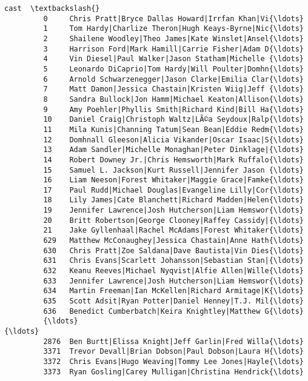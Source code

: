\documentclass[11pt]{article}
\begin{document}
\begin{Verbatim}[commandchars=\\\{\}]
                                                            cast  \textbackslash{}
         0     Chris Pratt|Bryce Dallas Howard|Irrfan Khan|Vi{\ldots}   
         1     Tom Hardy|Charlize Theron|Hugh Keays-Byrne|Nic{\ldots}   
         2     Shailene Woodley|Theo James|Kate Winslet|Ansel{\ldots}   
         3     Harrison Ford|Mark Hamill|Carrie Fisher|Adam D{\ldots}   
         4     Vin Diesel|Paul Walker|Jason Statham|Michelle {\ldots}   
         5     Leonardo DiCaprio|Tom Hardy|Will Poulter|Domhn{\ldots}   
         6     Arnold Schwarzenegger|Jason Clarke|Emilia Clar{\ldots}   
         7     Matt Damon|Jessica Chastain|Kristen Wiig|Jeff {\ldots}   
         8     Sandra Bullock|Jon Hamm|Michael Keaton|Allison{\ldots}   
         9     Amy Poehler|Phyllis Smith|Richard Kind|Bill Ha{\ldots}   
         10    Daniel Craig|Christoph Waltz|LÃ©a Seydoux|Ralp{\ldots}   
         11    Mila Kunis|Channing Tatum|Sean Bean|Eddie Redm{\ldots}   
         12    Domhnall Gleeson|Alicia Vikander|Oscar Isaac|S{\ldots}   
         13    Adam Sandler|Michelle Monaghan|Peter Dinklage|{\ldots}   
         14    Robert Downey Jr.|Chris Hemsworth|Mark Ruffalo{\ldots}   
         15    Samuel L. Jackson|Kurt Russell|Jennifer Jason {\ldots}   
         16    Liam Neeson|Forest Whitaker|Maggie Grace|Famke{\ldots}   
         17    Paul Rudd|Michael Douglas|Evangeline Lilly|Cor{\ldots}   
         18    Lily James|Cate Blanchett|Richard Madden|Helen{\ldots}   
         19    Jennifer Lawrence|Josh Hutcherson|Liam Hemswor{\ldots}   
         20    Britt Robertson|George Clooney|Raffey Cassidy|{\ldots}   
         21    Jake Gyllenhaal|Rachel McAdams|Forest Whitaker{\ldots}   
         629   Matthew McConaughey|Jessica Chastain|Anne Hath{\ldots}   
         630   Chris Pratt|Zoe Saldana|Dave Bautista|Vin Dies{\ldots}   
         631   Chris Evans|Scarlett Johansson|Sebastian Stan|{\ldots}   
         632   Keanu Reeves|Michael Nyqvist|Alfie Allen|Wille{\ldots}   
         633   Jennifer Lawrence|Josh Hutcherson|Liam Hemswor{\ldots}   
         634   Martin Freeman|Ian McKellen|Richard Armitage|K{\ldots}   
         635   Scott Adsit|Ryan Potter|Daniel Henney|T.J. Mil{\ldots}   
         636   Benedict Cumberbatch|Keira Knightley|Matthew G{\ldots}   
         {\ldots}                                                 {\ldots}   
         2876  Ben Burtt|Elissa Knight|Jeff Garlin|Fred Willa{\ldots}   
         3371  Trevor Devall|Brian Dobson|Paul Dobson|Laura H{\ldots}   
         3372  Chris Evans|Hugo Weaving|Tommy Lee Jones|Hayle{\ldots}   
         3373  Ryan Gosling|Carey Mulligan|Christina Hendrick{\ldots}   

\end{Verbatim}
\end{document}
